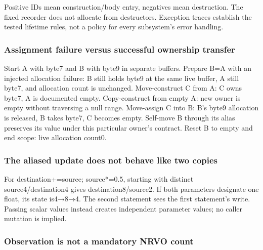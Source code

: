 Positive IDs mean construction/body entry, negatives mean destruction. The fixed recorder does not allocate from destructors. Exception traces establish the tested lifetime rules, not a policy for every subsystem's error handling.

\subsubsection{Assignment failure versus successful ownership transfer}\label{appendix-92ff77d4dfdc-assignment-failure-versus-successful-ownership-transfer}

\hypertarget{appendix-92ff77d4dfdc-assignment-failure-versus-successful-ownership-transfer}{}

Start A with byte7 and B with byte9 in separate buffers. Prepare B=A with an injected allocation failure: B still holds byte9 at the same live buffer, A still byte7, and allocation count is unchanged. Move-construct C from A: C owns byte7, A is documented empty. Copy-construct from empty A: new owner is empty without traversing a null range. Move-assign C into B: B's byte9 allocation is released, B takes byte7, C becomes empty. Self-move B through its alias preserves its value under this particular owner's contract. Reset B to empty and end scope: live allocation count0.

\subsubsection{The aliased update does not behave like two copies}\label{appendix-92ff77d4dfdc-the-aliased-update-does-not-behave-like-two-copies}

\hypertarget{appendix-92ff77d4dfdc-the-aliased-update-does-not-behave-like-two-copies}{}

For destination+=source; source*=0.5, starting with distinct source4/destination4 gives destination8/source2. If both parameters designate one float, its state is4→8→4. The second statement sees the first statement's write. Passing scalar values instead creates independent parameter values; no caller mutation is implied.

\subsubsection{Observation is not a mandatory NRVO count}\label{appendix-92ff77d4dfdc-observation-is-not-a-mandatory-nrvo-count}

\hypertarget{appendix-92ff77d4dfdc-observation-is-not-a-mandatory-nrvo-count}{}

